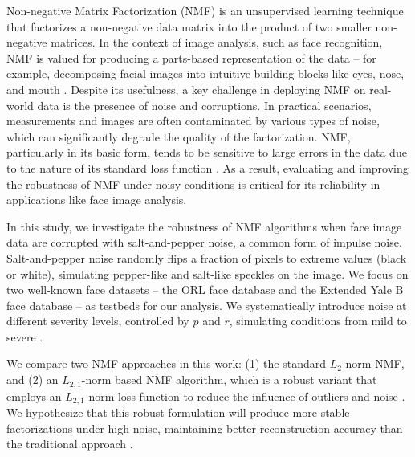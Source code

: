 
\noindent 

Non-negative Matrix Factorization (NMF) is an unsupervised learning technique that factorizes a non-negative data matrix into the product of two smaller non-negative matrices. In the context of image analysis, such as face recognition, NMF is valued for producing a parts-based representation of the data – for example, decomposing facial images into intuitive building blocks like eyes, nose, and mouth \cite{diaz2021analysis}. Despite its usefulness, a key challenge in deploying NMF on real-world data is the presence of noise and corruptions. In practical scenarios, measurements and images are often contaminated by various types of noise, which can significantly degrade the quality of the factorization. NMF, particularly in its basic form, tends to be sensitive to large errors in the data due to the nature of its standard loss function \cite{kang2023robustness}. As a result, evaluating and improving the robustness of NMF under noisy conditions is critical for its reliability in applications like face image analysis.

In this study, we investigate the robustness of NMF algorithms when face image data are corrupted with salt-and-pepper noise, a common form of impulse noise. Salt-and-pepper noise randomly flips a fraction of pixels to extreme values (black or white), simulating pepper-like and salt-like speckles on the image. We focus on two well-known face datasets – the ORL face database and the Extended Yale B face database – as testbeds for our analysis. We systematically introduce noise at different severity levels, controlled by $p$ and $r$, simulating conditions from mild to severe \cite{kang2023robustness}. 

We compare two NMF approaches in this work: (1) the standard $L_2$-norm NMF, and (2) an $L_{2,1}$-norm based NMF algorithm, which is a robust variant that employs an $L_{2,1}$-norm loss function to reduce the influence of outliers and noise \cite{kong2011robust,lu2016projective}. We hypothesize that this robust formulation will produce more stable factorizations under high noise, maintaining better reconstruction accuracy than the traditional approach \cite{wu2018manifold}.